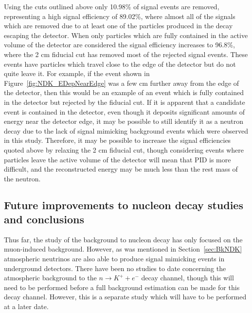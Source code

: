 Using the cuts outlined above only 10.98\% of signal events are removed, representing a high signal efficiency of 89.02\%, where almost all of the signals which are removed due to at least one of the particles produced in the decay escaping the detector. When only particles which are fully contained in the active volume of the detector are considered the signal efficiency increases to 96.8\%, where the 2 cm fiducial cut has removed most of the rejected signal events. These events have particles which travel close to the edge of the detector but do not quite leave it. For example, if the event shown in Figure~\ref{fig:NDK_EDepNearEdge} was a few cm further away from the edge of the detector, then this would be an example of an event which is fully contained in the detector but rejected by the fiducial cut. If it is apparent that a candidate event is contained in the detector, even though it deposits significant amounts of energy near the detector edge, it may be possible to still identify it as a neutron decay due to the lack of signal mimicking background events which were observed in this study. Therefore, it may be possible to increase the signal efficiencies quoted above by relaxing the 2 cm fiducial cut, though considering events where particles leave the active volume of the detector will mean that PID is more difficult, and the reconstructed energy may be much less than the rest mass of the neutron. \\ 

\subsection{Future improvements to nucleon decay studies and conclusions} \label{sec:NDKImprov}
Thus far, the study of the background to nucleon decay has only focused on the muon-induced background. However, as was mentioned in Section~\ref{sec:BkNDK} atmospheric neutrinos are also able to produce signal mimicking events in underground detectors. There have been no studies to date concerning the atmospheric background to the $n \rightarrow K^{+} + e^{-}$ decay channel, though this will need to be performed before a full background estimation can be made for this decay channel. However, this is a separate study which will have to be performed at a later date. \\

